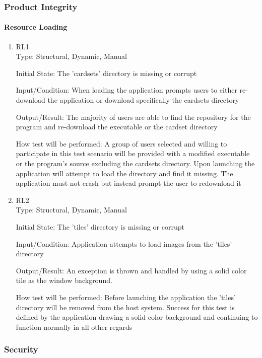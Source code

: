 \documentclass[12pt, titlepage]{article}
\begin{document}
	\subsubsection{Product Integrity}
	\paragraph{Resource Loading}
	\begin{enumerate}
		\item{RL1\\}
		Type: Structural, Dynamic, Manual
		
		Initial State: The 'cardsets' directory is missing or corrupt
		
		Input/Condition: When loading the application prompts users to either
		re-download the application or download specifically the cardsets directory
		
		Output/Result: The majority of users are able to find the repository for the
		program and re-download the executable or the cardset directory
		
		How test will be performed: A group of users selected and willing to
		participate in this test scenario will be provided with a modified executable
		or the program's source excluding the cardsets directory. Upon launching the
		application will attempt to load the directory and find it missing. The
		application must not crash but instead prompt the user to redownload it
		
		\item{RL2\\}
		Type: Structural, Dynamic, Manual
		
		Initial State: The 'tiles' directory is missing or corrupt
		
		Input/Condition: Application attempts to load images from the 'tiles' directory
		
		Output/Result: An exception is thrown and handled by using a solid color tile
		as the window background.
		
		How test will be performed: Before launching the application the 'tiles'
		directory will be removed from the host system. Success for this test is
		defined by the application drawing a solid color background and continuing
		to function normally in all other regards
	\end{enumerate}
	
	\subsubsection{Security}
\end{document}
